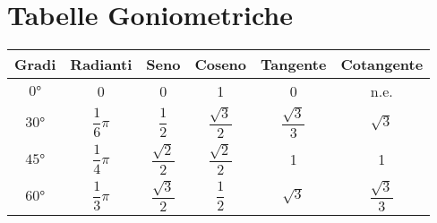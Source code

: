 \chapter{Tabelle Goniometriche}
\label{cha:TabelleGoniometriche}
\begin{table}[H]
	\centering
	\renewcommand{\arraystretch}{3}
	\begin{tabular}{cccccc}
		\toprule
		Gradi & Radianti & Seno & Coseno & Tangente & Cotangente \\ [.25cm]
		\midrule
		$\ang{0}$ & 0 & 0 & 1 & 0 & n.e. \\ [.25cm] 
		\hline%
		$\ang{30}$&$\dfrac{1}{6}\pi$&$\dfrac{1}{2}$&$\dfrac{\sqrt{3}}{2}$&$\dfrac{\sqrt{3}}{3}$&$\sqrt{3}$\\ [.25cm]
		\hline%
		$\ang{45}$&$\dfrac{1}{4}\pi$&$\dfrac{\sqrt{2}}{2}$& $\dfrac{\sqrt{2}}{2}$ & 1 & 1 \\ [.4cm]
		\hline%
		$\ang{60}$&$\dfrac{1}{3}\pi$&$\dfrac{\sqrt{3}}{2}$&$\dfrac{1}{2}$&$\sqrt{3}$&$\dfrac{\sqrt{3}}{3}$\\ [.25cm]

\end{tabular}
\end{table}
